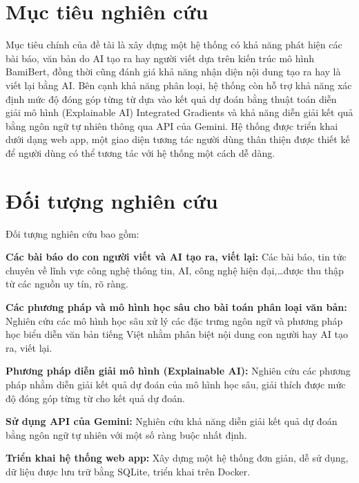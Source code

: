 \section{Mục tiêu nghiên cứu}
Mục tiêu chính của đề tài là xây dựng một hệ thống có khả năng phát hiện các bài báo, văn bản do AI tạo ra hay người viết dựa trên kiến trúc mô hình BamiBert, đồng thời cũng đánh giá khả năng nhận diện nội dung tạo ra hay là viết lại bằng AI.
Bên cạnh khả năng phân loại, hệ thống còn hỗ trợ khả năng xác định mức độ đóng góp từng từ dựa vào kết quả dự đoán bằng thuật toán diễn giải mô hình (Explainable AI) Integrated Gradients và khả năng diễn giải kết quả bằng ngôn ngữ tự nhiên thông qua
API của Gemini. Hệ thống được triển khai dưới dạng web app, một giao diện tương tác người dùng thân thiện được thiết kế để người dùng có thể tương tác với hệ thống một cách dễ dàng.

\section{Đối tượng nghiên cứu}
Đối tượng nghiên cứu bao gồm:

\vspace{\baselineskip}
\noindent \textbf{Các bài báo do con người viết và AI tạo ra, viết lại:} Các bài báo, tin tức chuyên về lĩnh vực công nghệ thông tin, AI, công nghệ hiện đại,\dots được thu thập từ các nguồn uy tín, rõ ràng.

\vspace{\baselineskip}
\noindent \textbf{Các phương pháp và mô hình học sâu cho bài toán phân loại văn bản:} Nghiên cứu các mô hình học sâu xử lý các đặc trưng ngôn ngữ và phương pháp học biểu diễn văn bản tiếng Việt nhằm phân biệt nội dung
con người hay AI tạo ra, viết lại.

\vspace{\baselineskip}
\noindent \textbf{Phương pháp diễn giải mô hình (Explainable AI):} Nghiên cứu các phương pháp nhằm diễn giải kết quả dự đoán của mô hình học sâu, giải thích được mức độ đóng góp từng từ cho kết quả dự đoán.

\vspace{\baselineskip}
\noindent \textbf{Sử dụng API của Gemini:} Nghiên cứu khả năng diễn giải kết quả dự đoán bằng ngôn ngữ tự nhiên với một số ràng buộc nhất định.

\vspace{\baselineskip}
\noindent \textbf{Triển khai hệ thống web app:} Xây dựng một hệ thống đơn giản, dễ sử dụng, dữ liệu được lưu trữ bằng SQLite, triển khai trên Docker.

